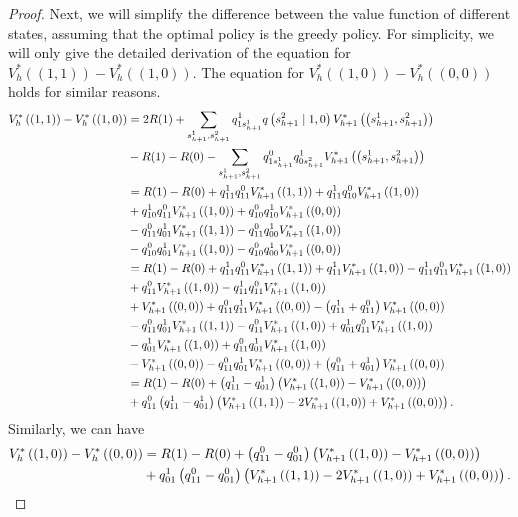 \begin{proof}
Next, we will simplify the difference between the value function of different states, assuming that the optimal policy is the greedy policy. For simplicity, we will only give the detailed derivation of the equation for $V_{h}^*\left((1,1)\right)-V_h^*\left((1,0)\right)$. The equation for $V_{h}^*\left((1,0)\right)-V_h^*\left((0,0)\right)$ holds for similar reasons.
\begin{align}
    V_{h}^*\left((1,1)\right)-V_h^*\left((1,0)\right)&=2R(1)+\sum_{s_{h+1}^1,s_{h+1}^2}q^1_{1s_{h+1}^1}q\left(s_{h+1}^2\mid 1,0\right)V_{h+1}^*\left(\left(s_{h+1}^1,s_{h+1}^2\right)\right)\notag\\
    &-R(1)-R(0)-\sum_{s_{h+1}^1,s_{h+1}^2}q^0_{1s_{h+1}^1}q^1_{0s_{h+1}^2}V_{h+1}^*\left(\left(s_{h+1}^1,s_{h+1}^2\right)\right)\notag\\
    &=R(1)-R(0)+q^1_{11}q^0_{11}V_{h+1}^*\left((1,1)\right)+q^1_{11}q^0_{10}V_{h+1}^*\left((1,0)\right)\notag\\&+q^1_{10}q^0_{11}V_{h+1}^*\left((1,0)\right)+q^0_{10}q^1_{10}V_{h+1}^*\left((0,0)\right)\notag\\
    &-q^0_{11}q^1_{01}V_{h+1}^*\left((1,1)\right)-q^0_{11}q^1_{00}V_{h+1}^*\left((1,0)\right)\notag\\&-q^0_{10}q^1_{01}V_{h+1}^*\left((1,0)\right)-q^0_{10}q^1_{00}V_{h+1}^*\left((0,0)\right)\notag\\
    &=R(1)-R(0)+q^1_{11}q^0_{11}V_{h+1}^*\left((1,1)\right)+q^1_{11}V_{h+1}^*\left((1,0)\right)-q^1_{11}q^0_{11}V_{h+1}^*\left((1,0)\right)\notag\\
    &+q^0_{11}V_{h+1}^*\left((1,0)\right)-q^1_{11}q^0_{11}V_{h+1}^*\left((1,0)\right)\notag\\&+V_{h+1}^*\left((0,0)\right)+q^0_{11}q^1_{11}V_{h+1}^*\left((0,0)\right)-\left(q^1_{11}+q^0_{11}\right)V_{h+1}^*\left((0,0)\right)\notag\\
    &-q^0_{11}q^1_{01}V_{h+1}^*\left((1,1)\right)-q^0_{11}V_{h+1}^*\left((1,0)\right)+q^1_{01}q^0_{11}V_{h+1}^*\left((1,0)\right)\notag\\
    &-q^1_{01}V_{h+1}^*\left((1,0)\right)+q^0_{11}q^1_{01}V_{h+1}^*\left((1,0)\right)\notag\\&-V_{h+1}^*\left((0,0)\right)-q^0_{11}q^1_{01}V_{h+1}^*\left((0,0)\right)+\left(q^0_{11}+q^1_{01}\right)V_{h+1}^*\left((0,0)\right)\notag\\
    &=R(1)-R(0)+\left(q^1_{11}-q^1_{01}\right)\left(V_{h+1}^*\left((1,0)\right)-V_{h+1}^*\left((0,0)\right)\right)\notag\\
    &+q^0_{11}\left(q^1_{11}-q^1_{01}\right)\left(V_{h+1}^*\left((1,1)\right)-2V_{h+1}^*\left((1,0)\right)+V_{h+1}^*\left((0,0)\right)\right).\label{eq:simplification-difference-1110}
\end{align}
Similarly, we can have
\begin{align}
    V_{h}^*\left((1,0)\right)-V_h^*\left((0,0)\right)&=R(1)-R(0)+\left(q^0_{11}-q^0_{01}\right)\left(V_{h+1}^*\left((1,0)\right)-V_{h+1}^*\left((0,0)\right)\right)\notag\\
    &+q^1_{01}\left(q^0_{11}-q^0_{01}\right)\left(V_{h+1}^*\left((1,1)\right)-2V_{h+1}^*\left((1,0)\right)+V_{h+1}^*\left((0,0)\right)\right)\label{eq:simplification-difference-1000}.
\end{align}


\end{proof}
